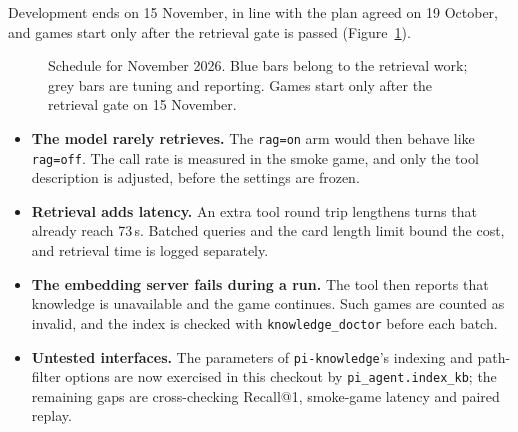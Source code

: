 \documentclass[11pt,a4paper]{article}
\newcommand{\code}[1]{\texttt{#1}}
\begin{document}
Development ends on 15 November, in line with the plan agreed on 19 October, and games start only after the
retrieval gate is passed (Figure~\ref{fig:gantt}).

\begin{figure}[t]
\centering
{}
\caption{Schedule for November 2026. Blue bars belong to the retrieval work; grey bars are tuning and
reporting. Games start only after the retrieval gate on 15 November.}
\label{fig:gantt}
\end{figure}

\begin{itemize}
  \item \textbf{The model rarely retrieves.} The \code{rag=on} arm would then behave like \code{rag=off}.
        The call rate is measured in the smoke game, and only the tool description is adjusted, before the
        settings are frozen.
  \item \textbf{Retrieval adds latency.} An extra tool round trip lengthens turns that already reach 73\,s.
        Batched queries and the card length limit bound the cost, and retrieval time is logged separately.
  \item \textbf{The embedding server fails during a run.} The tool then reports that knowledge is
        unavailable and the game continues. Such games are counted as invalid, and the index is checked with
        \code{knowledge\_doctor} before each batch.
  \item \textbf{Untested interfaces.} The parameters of \code{pi-knowledge}'s indexing and path-filter
        options are now exercised in this checkout by \code{pi\_agent.index\_kb}; the remaining gaps are
        cross-checking Recall@1, smoke-game latency and paired replay.
\end{itemize}
\end{document}
